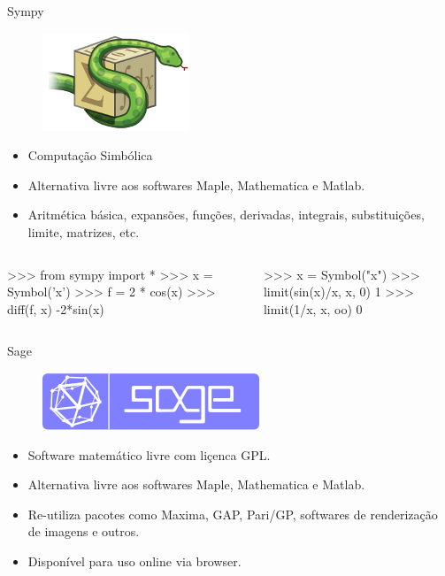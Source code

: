 \documentclass[12pt,t,graphics]{beamer}
\begin{document}

\begin{frame}[t,fragile]{Sympy}
	\begin{figure}
		\centering
		\includegraphics[scale=0.4]{img/sympylogo.png}
	\end{figure}
	\begin{itemize}
		\item Computação Simbólica
		\item Alternativa livre aos softwares Maple, Mathematica e Matlab.
		\item Aritmética básica, expansões, funções, derivadas, integrais, 
		substituições, limite, matrizes, etc.
	\end{itemize}
	\begin{columns}
		\begin{python}
		>>> from sympy import *
		>>> x = Symbol('x')
		>>> f = 2 * cos(x)
		>>> diff(f, x)
		-2*sin(x)
		\end{python}
		\begin{python}
		>>> x = Symbol("x")
		>>> limit(sin(x)/x, x, 0)
		1
		>>> limit(1/x, x, oo)
		0
		\end{python}
	\end{columns}
\end{frame}

\begin{frame}[t]{Sage}
	\begin{figure}
		\centering
		\includegraphics[scale=0.3]{img/logo_sage.png}
	\end{figure}
	\begin{itemize}
		\item Software matemático livre com liçenca GPL.
		\item Alternativa livre aos softwares Maple, Mathematica e Matlab.
		\item Re-utiliza pacotes como Maxima, GAP, Pari/GP, softwares de 
		renderização de imagens e outros.
		\item Disponível para uso online via browser.
	\end{itemize}
\end{frame}
\end{document}
